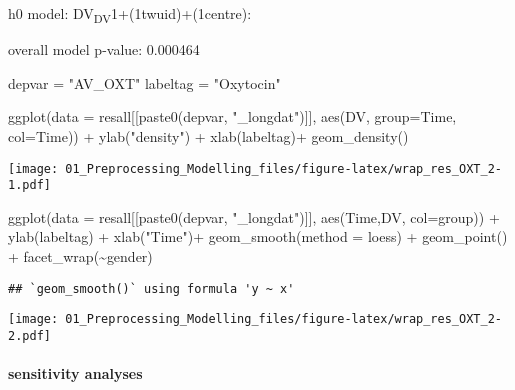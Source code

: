 \documentclass[
]{article}
\newenvironment{Shaded}{\begin{snugshade}}{\end{snugshade}}
\newcommand{\AttributeTok}[1]{\textcolor[rgb]{0.77,0.63,0.00}{#1}}
\newcommand{\FunctionTok}[1]{\textcolor[rgb]{0.00,0.00,0.00}{#1}}
\newcommand{\NormalTok}[1]{#1}
\newcommand{\OtherTok}[1]{\textcolor[rgb]{0.56,0.35,0.01}{#1}}
\newcommand{\SpecialCharTok}[1]{\textcolor[rgb]{0.00,0.00,0.00}{#1}}
\newcommand{\StringTok}[1]{\textcolor[rgb]{0.31,0.60,0.02}{#1}}
\begin{document}
h0 model: DV\textsubscript{DV}1+(1\textbar twuid)+(1\textbar centre):

overall model p-value: 0.000464

\begin{Shaded}
\begin{Highlighting}[]
\NormalTok{depvar }\OtherTok{=} \StringTok{"AV\_OXT"}
\NormalTok{labeltag }\OtherTok{=} \StringTok{"Oxytocin"}

\FunctionTok{ggplot}\NormalTok{(}\AttributeTok{data =}\NormalTok{ resall[[}\FunctionTok{paste0}\NormalTok{(depvar, }\StringTok{"\_longdat"}\NormalTok{)]], }
       \FunctionTok{aes}\NormalTok{(DV, }\AttributeTok{group=}\NormalTok{Time, }\AttributeTok{col=}\NormalTok{Time)) }\SpecialCharTok{+} 
  \FunctionTok{ylab}\NormalTok{(}\StringTok{"density"}\NormalTok{) }\SpecialCharTok{+} \FunctionTok{xlab}\NormalTok{(labeltag)}\SpecialCharTok{+}
  \FunctionTok{geom\_density}\NormalTok{()}
\end{Highlighting}
\end{Shaded}

\texttt{[image: 01\_Preprocessing\_Modelling\_files/figure-latex/wrap\_res\_OXT\_2-1.pdf]}

\begin{Shaded}
\begin{Highlighting}[]
\FunctionTok{ggplot}\NormalTok{(}\AttributeTok{data =}\NormalTok{ resall[[}\FunctionTok{paste0}\NormalTok{(depvar, }\StringTok{"\_longdat"}\NormalTok{)]], }
       \FunctionTok{aes}\NormalTok{(Time,DV, }\AttributeTok{col=}\NormalTok{group)) }\SpecialCharTok{+} 
  \FunctionTok{ylab}\NormalTok{(labeltag) }\SpecialCharTok{+} \FunctionTok{xlab}\NormalTok{(}\StringTok{"Time"}\NormalTok{)}\SpecialCharTok{+}
  \FunctionTok{geom\_smooth}\NormalTok{(}\AttributeTok{method =} \StringTok{\textquotesingle{}loess\textquotesingle{}}\NormalTok{) }\SpecialCharTok{+} \FunctionTok{geom\_point}\NormalTok{() }\SpecialCharTok{+}   \FunctionTok{facet\_wrap}\NormalTok{(}\SpecialCharTok{\textasciitilde{}}\NormalTok{gender)}
\end{Highlighting}
\end{Shaded}

\begin{verbatim}
## `geom_smooth()` using formula 'y ~ x'
\end{verbatim}

\texttt{[image: 01\_Preprocessing\_Modelling\_files/figure-latex/wrap\_res\_OXT\_2-2.pdf]}

\hypertarget{sensitivity-analyses-4}{%
\paragraph{sensitivity analyses}\label{sensitivity-analyses-4}}
\end{document}
